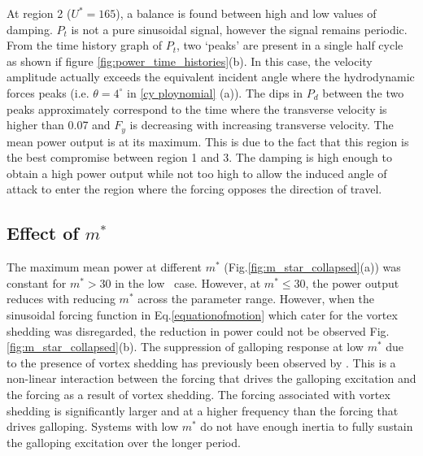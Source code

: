 At region 2 ($U^*=165$), a balance is found between high and low values of damping. $P_t$ is not a pure sinusoidal signal, however the signal remains periodic. From the time history graph of $P_t$, two `peaks' are present in a single half cycle as shown if figure \ref{fig:power_time_histories}(b). In this case, the velocity amplitude actually exceeds the equivalent incident angle where the hydrodynamic forces peaks (i.e. $\theta=4^\circ$ in \ref{cy ploynomial} (a)). The dips in $P_d$ between the two peaks approximately correspond to the time where the transverse velocity is higher than 0.07 and $F_y$ is decreasing with increasing transverse velocity. The mean power output is at its maximum. This is due to the fact that this region is the best compromise between region 1 and 3. The damping is high enough to obtain a high power output while not too high to allow the induced angle of attack to enter the region where the forcing opposes the direction of travel. 

  



\subsection{Effect of $m^*$}

 
 

The maximum mean power at different $m^*$ (Fig.\ref{fig:m_star_collapsed}(a)) was constant for $m^*>30$ in the low \reynoldsnumber\ case. However, at $m^* \leq 30$, the power output reduces with reducing $m^*$ across the parameter range. However, when the sinusoidal forcing function in Eq.\ref{equationofmotion} which cater for the vortex shedding was disregarded, the reduction in power could not be observed Fig.\ref{fig:m_star_collapsed}(b). The suppression of galloping response at low $m^*$ due to the presence of vortex shedding has previously been observed by \cite{Joly2012}. This is a non-linear interaction between the forcing that drives the galloping excitation and the forcing as a result of vortex shedding. The forcing associated with vortex  shedding is significantly larger and at a higher frequency than the forcing that drives galloping. Systems with low $m^*$ do not have enough inertia to fully sustain the galloping excitation over the longer period.

